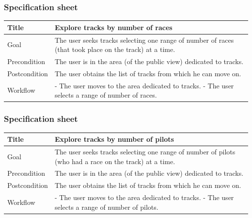 \documentclass{beamer}
\begin{document}
\begin{frame}
    \frametitle{Specification sheet}
    \begin{table}
        \tiny
        \begin{tabular}{|p{2cm}|p{6cm}|}
        \hline
        Title & \textbf{Explore tracks by number of races} \\
        \hline
        Goal & The user seeks tracks selecting one range of number of races
        (that took place on the track) at a time. \\ 
        \hline
        Precondition & The user is in the area (of the public view) dedicated to tracks.\\
        \hline
        Postcondition & The user obtains the list of tracks from which he can move on.\\
        \hline
        Workflow &
        - The user moves to the area dedicated to tracks. \newline
        - The user selects a range of number of races. \\
        \hline
        \end{tabular}
\end{table}
\end{frame}

\begin{frame}
    \frametitle{Specification sheet}
    \begin{table}
        \tiny
        \begin{tabular}{|p{2cm}|p{6cm}|}
        \hline
        Title & \textbf{Explore tracks by number of pilots} \\
        \hline
        Goal & The user seeks tracks selecting one range of number of pilots
        (who had a race on the track) at a time. \\
        \hline
        Precondition & The user is in the area (of the public view) dedicated to tracks.\\
        \hline
        Postcondition & The user obtains the list of tracks from which he can move on.\\
        \hline
        Workflow &
        - The user moves to the area dedicated to tracks. \newline
        - The user selects a range of number of pilots. \\
        \hline
        \end{tabular}
\end{table}
\end{frame}
\end{document}
